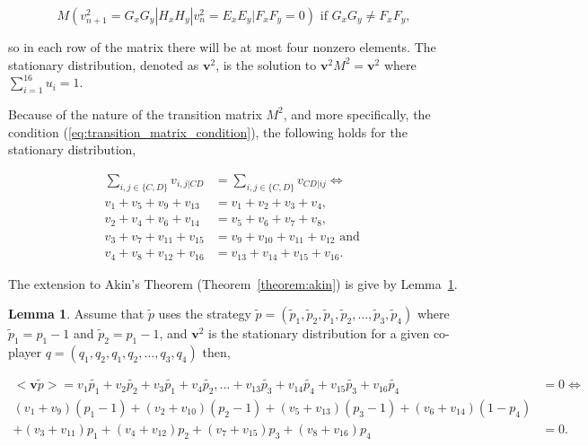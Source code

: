 \documentclass{article}
\theoremstyle{definition}
\newtheorem{lemma}[theorem]{Lemma}
\begin{document}
\begin{equation}\label{eq:transition_matrix_condition}
M(v^{2}_{n + 1} = G_x G_y | H_x H_y | v^{2}_{n}= E_x E_y | F_x F_y = 0) \text{ if } G_x G_y \neq F_x F_y,
\end{equation}

so in each row of the matrix there will be at most four nonzero
elements. The stationary distribution, denoted as \(\mathbf{v}^{2}\), is the
solution to \(\mathbf{v}^{2} M^{2} = \mathbf{v}^{2}\) where \(\sum_{i=1}^{16} u_{i} = 1\).

Because of the nature of the transition matrix \(M^2\), and more specifically,
the condition (\ref{eq:transition_matrix_condition}), the following holds
for the stationary distribution,

\begin{align}
  \sum_{i, j \in \{C, D\}} v_{i, j | CD} & = \sum_{i, j \in \{C, D\}} v_{CD | ij} \Leftrightarrow \\ \label{eq:two_bit_ss_relationship}
  v_1 + v_5 + v_9 + v_{13} & = v_1 + v_2 + v_3 + v_4    , \\
  v_2 + v_4 + v_6 + v_{14} & = v_5 + v_6 + v_7 + v_8    , \\
  v_3 + v_7 + v_{11} + v_{15} & = v_9 + v_{10} + v_{11} + v_{12} \text{ and } \\
  v_4 + v_8 + v_{12} + v_{16} & = v_{13} + v_{14} + v_{15} + v_{16}.
\end{align}

The extension to Akin's Theorem (Theorem~\ref{theorem:akin}) is give by
Lemma~\ref{lemma:akin_extended}.

\begin{lemma}\label{lemma:akin_extended}
  Assume that \(\tilde{p}\) uses the strategy \(\tilde{p} = (\tilde{p}_1, \tilde{p}_2,
  \tilde{p}_1, \tilde{p}_2, \dots, \tilde{p}_3, \tilde{p}_4)\) where \(\tilde{p}_1 = p_1 - 1\) and \(\tilde{p}_2 = p_1 - 1\), and
  \(\mathbf{v}^{2}\) is the stationary distribution for a given co-player \(q = (q_1, q_2, q_1, q_2, \dots, q_3, q_4)\) then,

  \begin{align} \label{eq:akin_condition_two_bits}
    <\mathbf{v} \tilde{p}> = v_1 \tilde{p_1} + v_2 \tilde{p_2} + v_3 \tilde{p_1} + v_4 \tilde{p_2}, \dots  
                           + v_{13} \tilde{p_3} + v_{14} \tilde{p_4} + v_{15} \tilde{p_3} + v_{16} \tilde{p_4} & = 0 \Leftrightarrow \nonumber \\
                           (v_{1} + v_{9}) (p_1 - 1) + (v_{2} + v_{10}) (p_2 - 1)  + (v_{5} + v_{13}) (p_3 - 1 ) + (v_{6} + v_{14}) (1 - p_4) \\
                           + (v_{3} + v_{11})p_1  + (v_{4} + v_{12})p_2 + (v_{7} + v_{15}) p_3 + (v_{8} + v_{16}) p_4 & = 0.
  \end{align}
\end{lemma}
\end{document}

